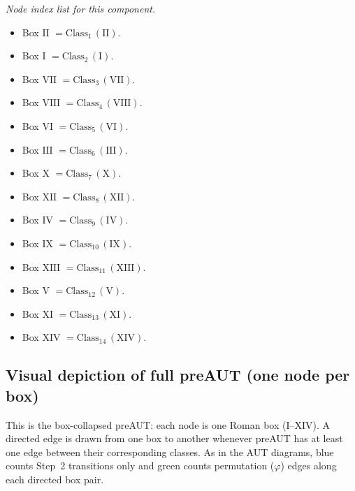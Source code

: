 \vfill
\clearpage
\noindent\textit{Node index list for this component.}
\begin{itemize}[leftmargin=*]
\item Box $\mathrm{II}$ $= \mathrm{Class}_{1}\,(\mathrm{II})$.
\item Box $\mathrm{I}$ $= \mathrm{Class}_{2}\,(\mathrm{I})$.
\item Box $\mathrm{VII}$ $= \mathrm{Class}_{3}\,(\mathrm{VII})$.
\item Box $\mathrm{VIII}$ $= \mathrm{Class}_{4}\,(\mathrm{VIII})$.
\item Box $\mathrm{VI}$ $= \mathrm{Class}_{5}\,(\mathrm{VI})$.
\item Box $\mathrm{III}$ $= \mathrm{Class}_{6}\,(\mathrm{III})$.
\item Box $\mathrm{X}$ $= \mathrm{Class}_{7}\,(\mathrm{X})$.
\item Box $\mathrm{XII}$ $= \mathrm{Class}_{8}\,(\mathrm{XII})$.
\item Box $\mathrm{IV}$ $= \mathrm{Class}_{9}\,(\mathrm{IV})$.
\item Box $\mathrm{IX}$ $= \mathrm{Class}_{10}\,(\mathrm{IX})$.
\item Box $\mathrm{XIII}$ $= \mathrm{Class}_{11}\,(\mathrm{XIII})$.
\item Box $\mathrm{V}$ $= \mathrm{Class}_{12}\,(\mathrm{V})$.
\item Box $\mathrm{XI}$ $= \mathrm{Class}_{13}\,(\mathrm{XI})$.
\item Box $\mathrm{XIV}$ $= \mathrm{Class}_{14}\,(\mathrm{XIV})$.
\end{itemize}

\clearpage

\subsection*{Visual depiction of full preAUT (one node per box)}
This is the box-collapsed preAUT: each node is one Roman box (I--XIV). A directed edge is drawn from one box to another whenever preAUT has at least one edge between their corresponding classes. As in the AUT diagrams, blue counts Step~2 transitions only and green counts permutation ($\varphi$) edges along each directed box pair.


